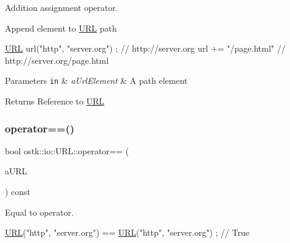 Addition assignment operator. 

Append element to \hyperlink{classostk_1_1io_1_1_u_r_l}{U\+RL} path


\begin{DoxyCode}
\hyperlink{classostk_1_1io_1_1_u_r_l_a2537e046cef4ac966cc295abb81279c2}{URL} url(\textcolor{stringliteral}{"http"}, \textcolor{stringliteral}{"server.org"}) ; \textcolor{comment}{// http://server.org}
url += \textcolor{stringliteral}{"/page.html"} \textcolor{comment}{// http://server.org/page.html}
\end{DoxyCode}



\begin{DoxyParams}[1]{Parameters}
\mbox{\tt in}  & {\em a\+Url\+Element} & A path element \\
\hline
\end{DoxyParams}
\begin{DoxyReturn}{Returns}
Reference to \hyperlink{classostk_1_1io_1_1_u_r_l}{U\+RL} 
\end{DoxyReturn}
\mbox{\label{classostk_1_1io_1_1_u_r_l_a46fed221d83ea9a6985b079ee6d6f151}} 
\subsubsection{\texorpdfstring{operator==()}{operator==()}}
{\footnotesize\ttfamily bool ostk\+::io\+::\+U\+R\+L\+::operator== (\begin{DoxyParamCaption}\item[{const \hyperlink{classostk_1_1io_1_1_u_r_l}{U\+RL} \&}]{a\+U\+RL }\end{DoxyParamCaption}) const}



Equal to operator. 


\begin{DoxyCode}
\hyperlink{classostk_1_1io_1_1_u_r_l_a2537e046cef4ac966cc295abb81279c2}{URL}(\textcolor{stringliteral}{"http"}, \textcolor{stringliteral}{"server.org"}) == \hyperlink{classostk_1_1io_1_1_u_r_l_a2537e046cef4ac966cc295abb81279c2}{URL}(\textcolor{stringliteral}{"http"}, \textcolor{stringliteral}{"server.org"}) ; \textcolor{comment}{// True}
\end{DoxyCode}



